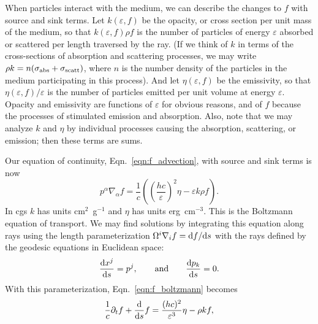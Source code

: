 When particles interact with the medium, we can describe the changes to $f$ with
source and sink terms.
Let $k(\varepsilon,f)$ be the opacity, or cross section per unit mass of the
medium, so that $k(\varepsilon,f)\rho f$ is the number of particles of energy
$\varepsilon$ absorbed or scattered per length traversed by the ray.
(If we think of $k$ in terms of the cross-sections of absorption and scattering
processes, we may write $\rho k = n(\sigma_{\rm abs}+\sigma_{\rm scatt})$, where
$n$ is the number density of the particles in the medium participating in this
process).
And let $\eta(\varepsilon,f)$ be the emissivity, so that
$\eta(\varepsilon,f)/\varepsilon$ is the number of particles emitted per
unit volume at energy $\varepsilon$.
Opacity and emissivity are functions of $\varepsilon$ for obvious reasons, and
of $f$ because the processes of stimulated emission and absorption.
Also, note that we may analyze $k$ and $\eta$ by individual processes causing the
absorption, scattering, or emission; then these terms are sums.

Our equation of continuity, Eqn.~\ref{eqn:f_advection},
with source and sink terms is now
\begin{equation}
  \label{eqn:f_boltzmann}
  p^\alpha\nabla_\alpha f = \frac{1}{c}
  \left( \left(\frac{hc}{\varepsilon}\right)^2\eta - \varepsilon k \rho f\right).
\end{equation}
In cgs $k$ has units cm$^2$~g$^{-1}$ and $\eta$ has units erg~cm$^{-3}$.
This is the Boltzmann equation of transport.
We may find solutions by integrating this equation along rays using the length
parameterization $\Omega^i\nabla_i f=\mathrm{d} f/\mathrm{d} s$ with the rays defined by
the geodesic equations in Euclidean space:
\begin{equation}
  \label{eqn:geo_straight_ray}
  \frac{\mathrm{d} x^j}{\mathrm{d} s}=p^j, \qquad {\rm and} \qquad
  \frac{\mathrm{d} p_k}{\mathrm{d} s}=0.
\end{equation}
With this parameterization, Eqn.~\ref{eqn:f_boltzmann} becomes
\begin{equation}
  \label{eqn:f_boltzmann_ray}
  \frac{1}{c} \partial_t f + \frac{\mathrm{d}}{\mathrm{d} s} f =
  \frac{(hc)^2}{\varepsilon^3}\eta - \rho k f,
\end{equation}

